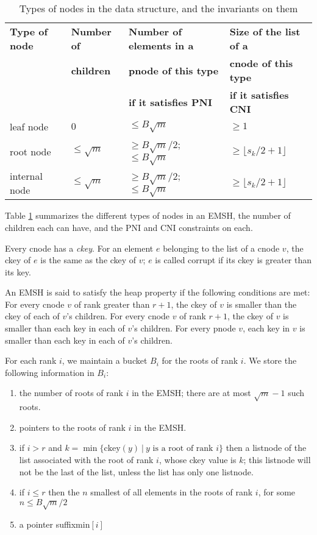 \begin{table}
\begin{center}
            \begin{tabular}{|l|l|l|l|}
\cline{1-4} \hline
 {\bf Type of node} & {\bf Number of} & {\bf Number of elements in a} & {\bf Size of the list of a} \\
              & {\bf children} & {\bf pnode of this type} & {\bf cnode of this type} \\
              &          & {\bf if it satisfies PNI} & {\bf if it satisfies CNI} \\
\hline \hline
               leaf node & $0$ & $\leq B\sqrt{m}$ & $\geq 1$  \\
\hline
               root node & $\leq\sqrt{m}$ & $\geq B\sqrt{m}/2$; $\leq B\sqrt{m}$  & $\geq \lfloor s_k/2 + 1\rfloor$ \\
\hline
               internal node & $\leq\sqrt{m}$ & $\geq B\sqrt{m}/2$; $\leq B\sqrt{m}$ & $\geq \lfloor s_k/2 + 1\rfloor$  \\
\hline
            \end{tabular}
\caption{Types of nodes in the data structure, and the invariants on them}
\label{tab:data:structure:emsh}
\end{center}
\end{table}
 
Table \ref{tab:data:structure:emsh} summarizes the different types of nodes in an EMSH, 
the number of children each can have, and the PNI and CNI constraints on each.

Every cnode has a {\em ckey}.
For an element $e$ belonging to the list of a cnode $v$,
	the ckey of $e$ is the same as the ckey of $v$; 
	$e$ is called corrupt if its ckey
	is greater than its key.

An EMSH is said to satisfy the heap property if the following
	conditions are met:
For every cnode $v$ of rank greater than $r+1$, the ckey of $v$ is smaller than 
	the ckey of each of $v$'s children.
For every cnode $v$ of rank $r+1$, the ckey of $v$ is smaller than
	each key in each of $v$'s children.
For every pnode $v$, each key in $v$ is smaller than each key in each of $v$'s
	children.

For each rank $i$, we maintain a bucket $B_{i}$ for the roots of rank $i$. 
We store the following information in $B_i$:
\begin{enumerate}
\item the number of roots of rank $i$ in the EMSH; there are at most $\sqrt{m}-1$ such roots.
\item pointers to the roots of rank $i$ in the EMSH.
\item if $i>r$ and $k=\min\{\mbox{ckey}(y)\ |\ y \mbox{ is a root of rank } i\}$
	then a listnode of the list associated with the root of rank $i$, whose ckey value is $k$;
	this listnode will not be the last of the list, unless the list has only one listnode. 
\item if $i \leq r$ then the $n$ smallest of all elements in the roots of rank $i$, 
	for some $n\leq B\sqrt{m}/2$
\item a pointer suffixmin$[i]$
\end{enumerate}

